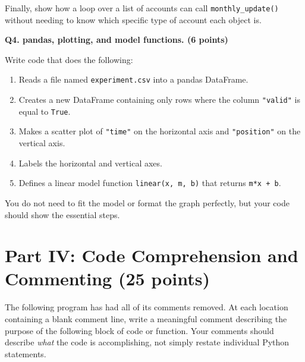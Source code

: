 \documentclass[12pt]{article}
\begin{document}
Finally, show how a loop over a list of accounts can call \texttt{monthly\_update()} without needing to know which specific type of account each object is.

\vspace{3.7in}
\newpage

\textbf{Q4. pandas, plotting, and model functions. (6 points)}

Write code that does the following:

\begin{enumerate}[label=\alph*.]
\item Reads a file named \texttt{experiment.csv} into a pandas DataFrame.
\item Creates a new DataFrame containing only rows where the column \texttt{"valid"} is equal to \texttt{True}.
\item Makes a scatter plot of \texttt{"time"} on the horizontal axis and \texttt{"position"} on the vertical axis.
\item Labels the horizontal and vertical axes.
\item Defines a linear model function \texttt{linear(x, m, b)} that returns \texttt{m*x + b}.
\end{enumerate}

You do not need to fit the model or format the graph perfectly, but your code should show the essential steps.

\vspace{3.6in}
\newpage

\section*{Part IV: Code Comprehension and Commenting (25 points)}

The following program has had all of its comments removed.  At each location
containing a blank comment line, write a meaningful comment describing the
purpose of the following block of code or function.  Your comments should
describe \emph{what} the code is accomplishing, not simply restate individual
Python statements.

\vspace{0.2cm}
\end{document}

